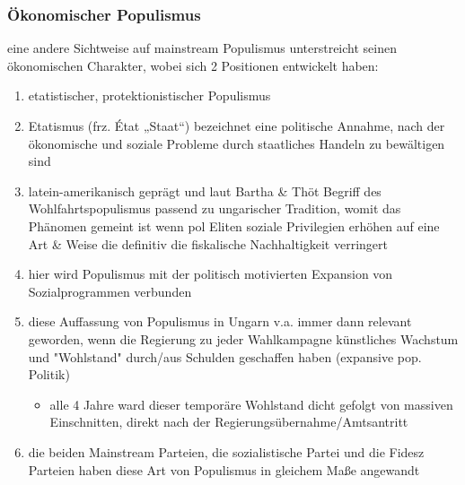 \documentclass[11pt]{article}
\begin{document}
\subsubsection{Ökonomischer Populismus}
\label{sec:org17ab749}
eine andere Sichtweise auf mainstream Populismus unterstreicht seinen ökonomischen Charakter, wobei sich 2 Positionen entwickelt haben:
\begin{enumerate}
\item etatistischer, protektionistischer Populismus

\item Etatismus (frz. État „Staat“) bezeichnet eine politische Annahme, nach der ökonomische und soziale Probleme durch staatliches Handeln zu bewältigen sind
\item latein-amerikanisch geprägt und laut Bartha \& Thöt Begriff des Wohlfahrtspopulismus passend zu ungarischer Tradition, womit das Phänomen gemeint ist wenn pol Eliten soziale Privilegien erhöhen auf eine Art \& Weise die definitiv die fiskalische Nachhaltigkeit verringert
\item hier wird Populismus mit der politisch motivierten Expansion von Sozialprogrammen verbunden
\item diese Auffassung von Populismus in Ungarn v.a. immer dann relevant geworden, wenn die Regierung zu jeder Wahlkampagne künstliches Wachstum und "Wohlstand" durch/aus Schulden geschaffen haben (expansive pop. Politik)
\begin{itemize}
\item alle 4 Jahre ward dieser temporäre Wohlstand dicht gefolgt von massiven Einschnitten, direkt nach der Regierungsübernahme/Amtsantritt
\end{itemize}
\item die beiden Mainstream Parteien, die sozialistische Partei und die Fidesz Parteien haben diese Art von Populismus in gleichem Maße angewandt


\end{enumerate}
\end{document}

